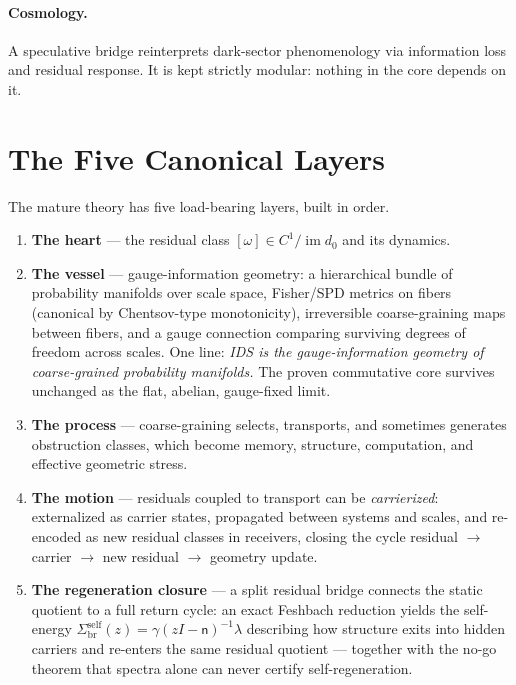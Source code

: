 \documentclass[11pt,a4paper]{article}
\theoremstyle{plain}
\begin{document}
\paragraph{Cosmology.}
A speculative bridge reinterprets dark-sector phenomenology via information loss and residual response. It is kept strictly modular: nothing in the core depends on it.

\section{The Five Canonical Layers}\label{sec:layers}

The mature theory has five load-bearing layers, built in order.

\begin{enumerate}[itemsep=2pt,topsep=3pt]
\item \textbf{The heart} --- the residual class $[\omega]\in C^1/\operatorname{im}d_0$ and its dynamics.
\item \textbf{The vessel} --- gauge-information geometry: a hierarchical bundle of probability manifolds over scale space, Fisher/SPD metrics on fibers (canonical by Chentsov-type monotonicity), irreversible coarse-graining maps between fibers, and a gauge connection comparing surviving degrees of freedom across scales. One line: \emph{IDS is the gauge-information geometry of coarse-grained probability manifolds.} The proven commutative core survives unchanged as the flat, abelian, gauge-fixed limit.
\item \textbf{The process} --- coarse-graining selects, transports, and sometimes generates obstruction classes, which become memory, structure, computation, and effective geometric stress.
\item \textbf{The motion} --- residuals coupled to transport can be \emph{carrierized}: externalized as carrier states, propagated between systems and scales, and re-encoded as new residual classes in receivers, closing the cycle residual $\to$ carrier $\to$ new residual $\to$ geometry update.
\item \textbf{The regeneration closure} --- a split residual bridge connects the static quotient to a full return cycle: an exact Feshbach reduction yields the self-energy $\Sigma_{\mathrm{br}}^{\mathrm{self}}(z)=\gamma(zI-\mathsf n)^{-1}\lambda$ describing how structure exits into hidden carriers and re-enters the same residual quotient --- together with the no-go theorem that spectra alone can never certify self-regeneration.
\end{enumerate}
\end{document}
